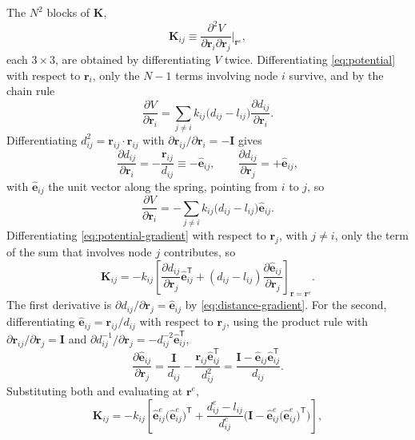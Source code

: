 \documentclass[11pt]{article}
\newcommand{\rr}{\mathbf{r}}
\newcommand{\ee}{\hat{\mathbf{e}}}
\newcommand{\KK}{\mathbf{K}}
\newcommand{\re}{\rr^{e}}
\newcommand{\rrij}{\mathbf{r}_{ij}}
\newcommand{\eeij}{\ee_{ij}}
\newcommand{\eeije}{\ee^{e}_{ij}}
\newcommand{\dije}{d^{e}_{ij}}
\newcommand{\lij}{l_{ij}}
\newcommand{\kij}{k_{ij}}
\newcommand{\dij}{d_{ij}}
\begin{document}
The $N^2$ blocks of $\KK$,
\begin{equation}
\KK_{ij} \equiv \frac{\partial^2 V}{\partial \rr_i \partial \rr_j}\bigg|_{\re},
\label{eq:hessian-blocks}
\end{equation}
each $3\times3$, are obtained by differentiating $V$ twice.
Differentiating \eqref{eq:potential} with respect to $\rr_i$, only the $N-1$ terms involving node $i$ survive, and by the chain rule
\begin{equation}
\frac{\partial V}{\partial \rr_i}
= \sum_{j \ne i} \kij \big(\dij - \lij\big) \frac{\partial \dij}{\partial \rr_i}.
\end{equation}
Differentiating $\dij^2 = \rrij\cdot\rrij$ with $\partial \rrij/\partial\rr_i = -\mathbf{I}$ gives
\begin{equation}
\frac{\partial \dij}{\partial \rr_i} = -\frac{\rrij}{\dij}
\equiv -\eeij,
\qquad
\frac{\partial \dij}{\partial \rr_j} = +\eeij,
\label{eq:distance-gradient}
\end{equation}
with $\eeij$ the unit vector along the spring, pointing from $i$ to $j$, so
\begin{equation}
\frac{\partial V}{\partial \rr_i}
= -\sum_{j \ne i} \kij \big(\dij - \lij\big) \eeij .
\label{eq:potential-gradient}
\end{equation}
Differentiating \eqref{eq:potential-gradient} with respect to $\rr_j$, with $j \ne i$, only the term of the sum that involves node $j$ contributes, so
\begin{equation}
\KK_{ij}
= -\kij\left[
\frac{\partial \dij}{\partial \rr_j}\eeij^{\mathsf T}
+ (\dij - \lij) \frac{\partial \eeij}{\partial \rr_j}
\right]_{\rr = \re}.
\end{equation}
The first derivative is $\partial \dij/\partial\rr_j = \eeij$ by \eqref{eq:distance-gradient}.
For the second, differentiating $\eeij = \rrij/\dij$ with respect to $\rr_j$, using the product rule with $\partial \rrij/\partial\rr_j = \mathbf{I}$ and $\partial \dij^{-1}/\partial \rr_j = -\dij^{-2}\eeij^{\mathsf T}$,
\begin{equation}
\frac{\partial \eeij}{\partial \rr_j}
= \frac{\mathbf{I}}{\dij} - \frac{\rrij\eeij^{\mathsf T}}{\dij^{2}}
= \frac{\mathbf{I} - \eeij\eeij^{\mathsf T}}{\dij}.
\label{eq:unit-vector-derivative}
\end{equation}
Substituting both and evaluating at $\re$,
\begin{equation}
\KK_{ij}
= -\kij\left[ \eeije\big(\eeije\big)^{\mathsf T}
+ \frac{\dije - \lij}{\dije}
\Big(\mathbf{I} - \eeije\big(\eeije\big)^{\mathsf T}\Big) \right],
\end{equation}
\end{document}
